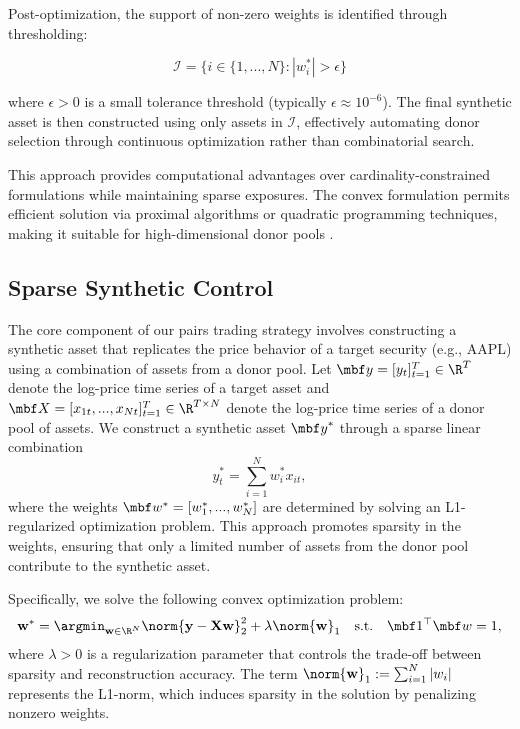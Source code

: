 Post-optimization, the support of non-zero weights is identified through thresholding:

\begin{equation*}
\mathcal{I} = \{i \in \{1,...,N\} : |w^*_i| > \epsilon\}
\end{equation*}

where $\epsilon > 0$ is a small tolerance threshold (typically $\epsilon \approx 10^{-6}$). The final synthetic asset is then constructed using only assets in $\mathcal{I}$, effectively automating donor selection through continuous optimization rather than combinatorial search.

This approach provides computational advantages over cardinality-constrained formulations while maintaining sparse exposures. The convex formulation permits efficient solution via proximal algorithms or quadratic programming techniques, making it suitable for high-dimensional donor pools \cite{beck2009fast}.


\subsection{Sparse Synthetic Control}

The core component of our pairs trading strategy involves constructing a synthetic asset that replicates the price behavior of a target security (e.g., AAPL) using a combination of assets from a donor pool. Let $\mbf y = [y_{t}]_{t=1}^T\in \R^{T}$ denote the log-price time series of a target asset and $\mbf X = [x_{1t}, ..., x_{Nt}]_{t=1}^T\in\R^{T\times N}$ denote the log-price time series of a donor pool of assets. We construct a synthetic asset ${\mbf y}^*$ through a sparse linear combination
\begin{equation*}
{y}_{t}^* = \sum_{i=1}^N w_i^* x_{it},
\end{equation*}
where the weights $\mbf w^*=[w_1^*, ..., w_N^*]$ are determined by solving an L1-regularized optimization problem. This approach promotes sparsity in the weights, ensuring that only a limited number of assets from the donor pool contribute to the synthetic asset.

Specifically, we solve the following convex optimization problem:
\begin{equation*}
\mathbf{w}^* = \argmin_{\mathbf{w} \in \R^{N}} \norm{\mathbf{y} - \mathbf{X}\mathbf{w}}_2^2 + \lambda \norm{\mathbf{w}}_1 
\quad \text{s.t.} \quad 
\mbf 1^\top \mbf w = 1,
\end{equation*}
where $\lambda > 0$ is a regularization parameter that controls the trade-off between sparsity and reconstruction accuracy. The term $\norm{\mathbf{w}}_1 := \sum_{i=1}^N |w_i|$ represents the L1-norm, which induces sparsity in the solution by penalizing nonzero weights.

